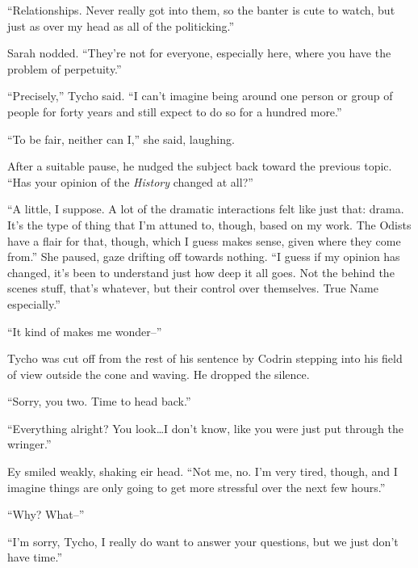 ``Relationships. Never really got into them, so the banter is cute to watch, but just as over my head as all of the politicking.''

Sarah nodded. ``They're not for everyone, especially here, where you have the problem of perpetuity.''

``Precisely,'' Tycho said. ``I can't imagine being around one person or group of people for forty years and still expect to do so for a hundred more.''

``To be fair, neither can I,'' she said, laughing.

After a suitable pause, he nudged the subject back toward the previous topic. ``Has your opinion of the \emph{History} changed at all?''

``A little, I suppose. A lot of the dramatic interactions felt like just that: drama. It's the type of thing that I'm attuned to, though, based on my work. The Odists have a flair for that, though, which I guess makes sense, given where they come from.'' She paused, gaze drifting off towards nothing. ``I guess if my opinion has changed, it's been to understand just how deep it all goes. Not the behind the scenes stuff, that's whatever, but their control over themselves. True Name especially.''

``It kind of makes me wonder--''

Tycho was cut off from the rest of his sentence by Codrin stepping into his field of view outside the cone and waving. He dropped the silence.

``Sorry, you two. Time to head back.''

``Everything alright? You look\ldots I don't know, like you were just put through the wringer.''

Ey smiled weakly, shaking eir head. ``Not me, no. I'm very tired, though, and I imagine things are only going to get more stressful over the next few hours.''

``Why? What--''

``I'm sorry, Tycho, I really do want to answer your questions, but we just don't have time.''
